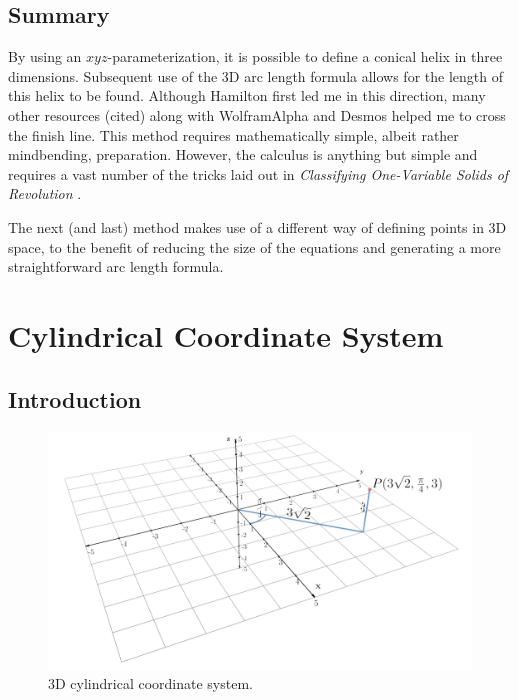 \documentclass{article}
\begin{document}
\subsection{Summary}
By using an $xyz$-parameterization, it is possible to define a conical helix in three dimensions. Subsequent use of the 3D arc length formula allows for the length of this helix to be found. Although Hamilton \cite{Bib:param} first led me in this direction, many other resources (cited) along with WolframAlpha and Desmos helped me to cross the finish line. This method requires mathematically simple, albeit rather mindbending, preparation. However, the calculus is anything but simple and requires a vast number of the tricks laid out in \emph{Classifying One-Variable Solids of Revolution} \cite{Bib:Class1Var}.\par
The next (and last) method makes use of a different way of defining points in 3D space, to the benefit of reducing the size of the equations and generating a more straightforward arc length formula.
\newpage



\section{Cylindrical Coordinate System}
\subsection{Introduction}

\begin{figure}[h!]
    \centering
    \includegraphics[width=0.711\linewidth]{Blender/cylindrical.png}
    \caption{3D cylindrical coordinate system.}
    \label{fig:cyli}
\end{figure}
\end{document}
